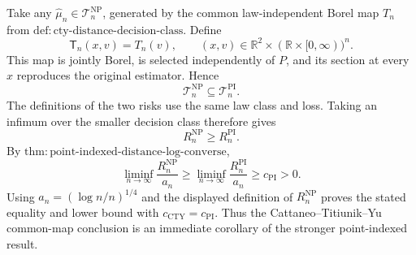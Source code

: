Take any \(\widehat\mu_n\in\mathcal T_n^{\mathrm{NP}}\), generated by the common law-independent Borel map \(T_n\) from \(\mathrm{def:cty\text{-}distance\text{-}decision\text{-}class}\).  Define
\[
 \mathsf T_n(x,v)=T_n(v),
 \qquad (x,v)\in\mathbb R^2\times(\mathbb R\times[0,\infty))^n.
\]
This map is jointly Borel, is selected independently of \(P\), and its section at every \(x\) reproduces the original estimator.  Hence
\[
 \mathcal T_n^{\mathrm{NP}}\subseteq\mathcal T_n^{\mathrm{PI}}.
\]
The definitions of the two risks use the same law class and loss.  Taking an infimum over the smaller decision class therefore gives
\[
 R_n^{\mathrm{NP}}\geq R_n^{\mathrm{PI}}.
\]
By \(\mathrm{thm:point\text{-}indexed\text{-}distance\text{-}log\text{-}converse}\),
\[
 \liminf_{n\to\infty}\frac{R_n^{\mathrm{NP}}}{a_n}
 \geq
 \liminf_{n\to\infty}\frac{R_n^{\mathrm{PI}}}{a_n}
 \geq c_{\mathrm{PI}}>0.
\]
Using \(a_n=(\log n/n)^{1/4}\) and the displayed definition of \(R_n^{\mathrm{NP}}\) proves the stated equality and lower bound with \(c_{\mathrm{CTY}}=c_{\mathrm{PI}}\).  Thus the Cattaneo--Titiunik--Yu common-map conclusion is an immediate corollary of the stronger point-indexed result.